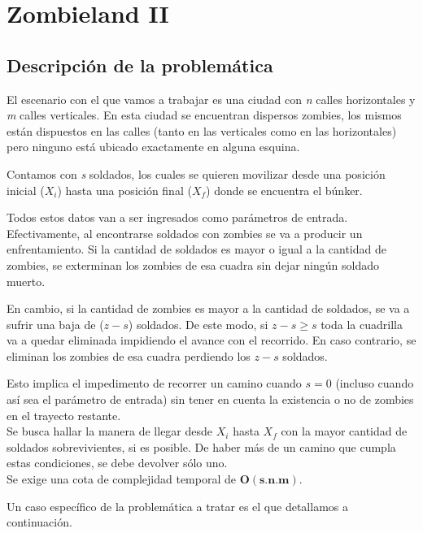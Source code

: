 \section{Zombieland II}
\subsection{Descripci\'on de la problem\'atica}


El escenario con el que vamos a trabajar es una ciudad con \emph{n} calles horizontales y \emph{m} calles verticales. En esta ciudad se encuentran dispersos zombies, los mismos est\'an dispuestos en las calles (tanto en las verticales como en las horizontales) pero ninguno est\'a ubicado exactamente en alguna esquina. 

Contamos con \emph{s} soldados, los cuales se quieren movilizar desde una posici\'on inicial ($X_i$) hasta una posici\'on final ($X_f$) donde se encuentra el b\'unker.

Todos estos datos van a ser ingresados como par\'ametros de entrada.\\

Efectivamente, al encontrarse soldados con zombies se va a producir un enfrentamiento. Si la cantidad de soldados es mayor o igual a la cantidad de zombies, se exterminan los zombies de esa cuadra sin dejar ning\'un soldado muerto. 

En cambio, si la cantidad de zombies es mayor a la cantidad de soldados, se va a sufrir una baja de ($z-s$) soldados. De este modo, si $z-s\geq s$ toda la cuadrilla va a quedar eliminada impidiendo el avance con el recorrido. En caso contrario, se eliminan los zombies de esa cuadra perdiendo los $z-s$ soldados.

Esto implica el impedimento de recorrer un camino cuando $s=0$ (incluso cuando as\'i sea el par\'ametro de entrada) sin tener en cuenta la existencia o no de zombies en el trayecto restante.\\

Se busca hallar la manera de llegar desde $X_i$ hasta $X_f$ con la mayor cantidad de soldados sobrevivientes, si es posible. De haber m\'as de un camino que cumpla estas condiciones, se debe devolver s\'olo uno.\\

Se exige una cota de complejidad temporal de $\mathbf{O(s.n.m)}$.\\

\bigskip

Un caso espec\'ifico de la problem\'atica a tratar es el que detallamos a continuaci\'on.\\

